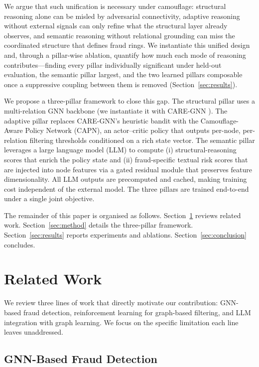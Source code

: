 \documentclass{conf}
\begin{document}
We argue that such unification is necessary under camouflage: structural reasoning alone can be misled by adversarial connectivity, adaptive reasoning without external signals can only refine what the structural layer already observes, and semantic reasoning without relational grounding can miss the coordinated structure that defines fraud rings. We instantiate this unified design and, through a pillar-wise ablation, quantify how much each mode of reasoning contributes---finding every pillar individually significant under held-out evaluation, the semantic pillar largest, and the two learned pillars composable once a suppressive coupling between them is removed (Section~\ref{sec:results}).

We propose a three-pillar framework to close this gap. The structural pillar uses a multi-relation GNN backbone (we instantiate it with CARE-GNN \cite{dou2020enhancing}). The adaptive pillar replaces CARE-GNN's heuristic bandit with the Camouflage-Aware Policy Network (CAPN), an actor--critic policy that outputs per-node, per-relation filtering thresholds conditioned on a rich state vector. The semantic pillar leverages a large language model (LLM) to compute (i) structural-reasoning scores that enrich the policy state and (ii) fraud-specific textual risk scores that are injected into node features via a gated residual module that preserves feature dimensionality. All LLM outputs are precomputed and cached, making training cost independent of the external model. The three pillars are trained end-to-end under a single joint objective.


The remainder of this paper is organised as follows. Section~\ref{sec:related} reviews related work. Section~\ref{sec:method} details the three-pillar framework. Section~\ref{sec:results} reports experiments and ablations. Section~\ref{sec:conclusion} concludes.

\section{Related Work}
\label{sec:related}

We review three lines of work that directly motivate our contribution:
GNN-based fraud detection, reinforcement learning for graph-based
filtering, and LLM integration with graph learning. We focus on the
specific limitation each line leaves unaddressed.

\subsection{GNN-Based Fraud Detection}
\end{document}
